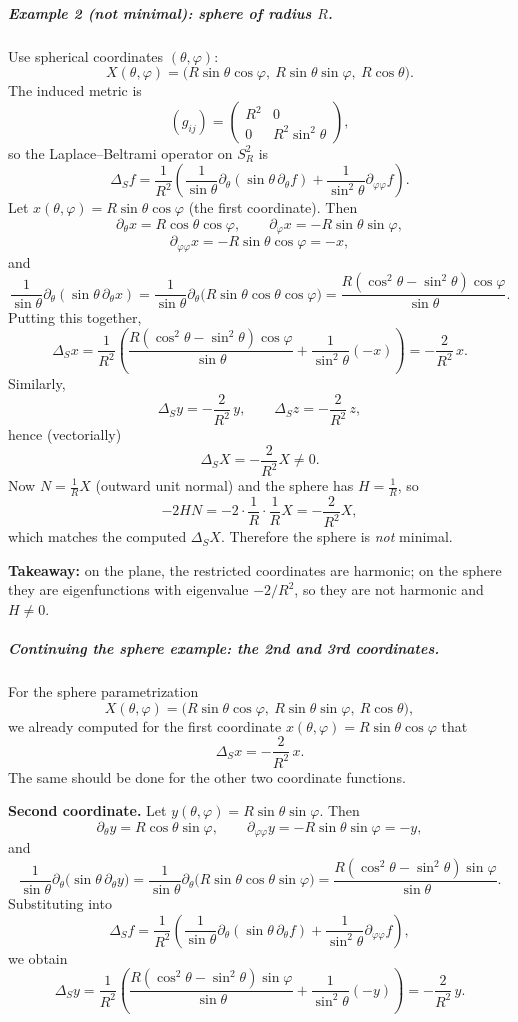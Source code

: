 \documentclass[12pt,a4paper]{article}
\theoremstyle{plain}
\theoremstyle{definition}      %
\begin{document}
\subparagraph{Example 2 (not minimal): sphere of radius $R$.}
Use spherical coordinates $(\theta,\varphi)$:
\[
X(\theta,\varphi)=\bigl(R\sin\theta\cos\varphi,\ R\sin\theta\sin\varphi,\ R\cos\theta\bigr).
\]
The induced metric is
\[
(g_{ij})=\begin{pmatrix}R^2&0\\[2pt]0&R^2\sin^2\theta\end{pmatrix},
\]
so the Laplace--Beltrami operator on $S_R^2$ is
\[
\Delta_S f=\frac{1}{R^2}\left(\frac{1}{\sin\theta}\partial_\theta(\sin\theta\,\partial_\theta f)
+\frac{1}{\sin^2\theta}\partial_{\varphi\varphi} f\right).
\]
Let $x(\theta,\varphi)=R\sin\theta\cos\varphi$ (the first coordinate). Then
\[
\partial_\theta x=R\cos\theta\cos\varphi,\qquad
\partial_\varphi x=-R\sin\theta\sin\varphi,
\]
\[
\partial_{\varphi\varphi}x=-R\sin\theta\cos\varphi=-x,
\]
and
\[
\frac{1}{\sin\theta}\partial_\theta(\sin\theta\,\partial_\theta x)
=\frac{1}{\sin\theta}\partial_\theta\bigl(R\sin\theta\cos\theta\cos\varphi\bigr)
=\frac{R(\cos^2\theta-\sin^2\theta)\cos\varphi}{\sin\theta}.
\]
Putting this together,
\[
\Delta_S x
=\frac{1}{R^2}\left(\frac{R(\cos^2\theta-\sin^2\theta)\cos\varphi}{\sin\theta}
+\frac{1}{\sin^2\theta}(-x)\right)
=-\frac{2}{R^2}\,x.
\]
Similarly,
\[
\Delta_S y=-\frac{2}{R^2}\,y,\qquad \Delta_S z=-\frac{2}{R^2}\,z,
\]
hence (vectorially)
\[
\Delta_S X=-\frac{2}{R^2}X\neq 0.
\]
Now $N=\frac{1}{R}X$ (outward unit normal) and the sphere has $H=\frac{1}{R}$, so
\[
-2HN=-2\cdot\frac{1}{R}\cdot \frac{1}{R}X=-\frac{2}{R^2}X,
\]
which matches the computed $\Delta_S X$. Therefore the sphere is \emph{not} minimal.

\medskip
\textbf{Takeaway:} on the plane, the restricted coordinates are harmonic; on the sphere they are eigenfunctions
with eigenvalue $-2/R^2$, so they are not harmonic and $H\neq 0$.

\subparagraph{Continuing the sphere example: the 2nd and 3rd coordinates.}
For the sphere parametrization
\[
X(\theta,\varphi)=\bigl(R\sin\theta\cos\varphi,\ R\sin\theta\sin\varphi,\ R\cos\theta\bigr),
\]
we already computed for the first coordinate $x(\theta,\varphi)=R\sin\theta\cos\varphi$ that
\[
\Delta_S x=-\frac{2}{R^2}\,x.
\]
The same should be done for the other two coordinate functions.

\medskip
\textbf{Second coordinate.}
Let $y(\theta,\varphi)=R\sin\theta\sin\varphi$. Then
\[
\partial_\theta y=R\cos\theta\sin\varphi,\qquad
\partial_{\varphi\varphi}y=-R\sin\theta\sin\varphi=-y,
\]
and
\[
\frac{1}{\sin\theta}\partial_\theta\bigl(\sin\theta\,\partial_\theta y\bigr)
=\frac{1}{\sin\theta}\partial_\theta\bigl(R\sin\theta\cos\theta\sin\varphi\bigr)
=\frac{R(\cos^2\theta-\sin^2\theta)\sin\varphi}{\sin\theta}.
\]
Substituting into
\[
\Delta_S f=\frac{1}{R^2}\left(\frac{1}{\sin\theta}\partial_\theta(\sin\theta\,\partial_\theta f)
+\frac{1}{\sin^2\theta}\partial_{\varphi\varphi} f\right),
\]
we obtain
\[
\Delta_S y
=\frac{1}{R^2}\left(\frac{R(\cos^2\theta-\sin^2\theta)\sin\varphi}{\sin\theta}
+\frac{1}{\sin^2\theta}(-y)\right)
=-\frac{2}{R^2}\,y.
\]
\end{document}
